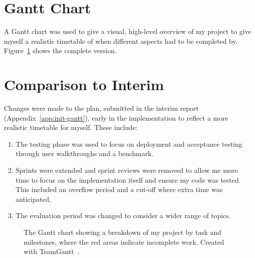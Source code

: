 
\section{Gantt Chart}

A Gantt chart was used to give a visual, high-level overview of my project to give myself a realistic timetable of when different aspects had to be completed by. 
\x
Figure~\ref{fig:gantt-chart} shows the complete version.

\section{Comparison to Interim}

Changes were made to the plan, submitted in the interim report (Appendix~\ref{app:init-gantt}), early in the implementation to reflect a more realistic timetable for myself. These include:

\begin{enumerate}
  \item The testing phase was used to focus on deployment and acceptance testing through user walkthroughs and a benchmark.
  \item Sprints were extended and sprint reviews were removed to allow me more time to focus on the implementation itself and ensure my code was tested. This included an overflow period and a cut-off where extra time was anticipated.
  \item The evaluation period was changed to consider a wider range of topics.
\end{enumerate}

\begin{landscape}
  \begin{figure}
    
    \vspace{150mm}
    \caption{The Gantt chart showing a breakdown of my project by task and milestones, where the red areas indicate incomplete work. Created with TeamGantt~\cite{noauthor_free_nodate}.}
    \label{fig:gantt-chart}
  \end{figure}
\end{landscape}
